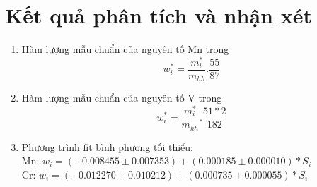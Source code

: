 \section{Kết quả phân tích và nhận xét}
\begin{enumerate}
    \item Hàm lượng mẫu chuẩn của nguyên tố Mn trong 
    \begin{equation}
        w_i^* = \dfrac{m_i^*}{m_{hh}}.\dfrac{55}{87}
    \end{equation}
    \item Hàm lượng mẫu chuẩn của nguyên tố V trong 
    \begin{equation}
        w_i^* = \dfrac{m_i^*}{m_{hh}}.\dfrac{51*2}{182}
    \end{equation}

    \item Phương trình fit bình phương tối thiểu:\\
    Mn: $w_i =  (-0.008455 \pm 0.007353)  +  (  0.000185 \pm  0.000010 ) * S_i $\\
    Cr: $w_i = ( -0.012270 \pm   0.010212) +   (0.000735 \pm  0.000055 )* S_i $ 

    
\end{enumerate}


